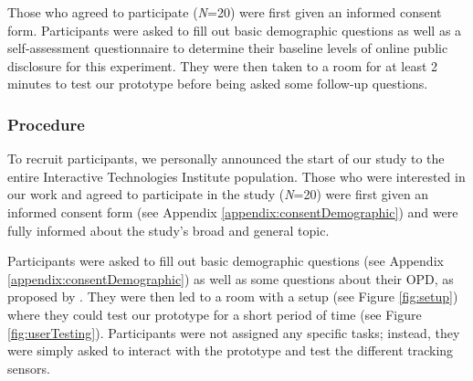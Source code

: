 Those who agreed to participate (\textit{N}=20) were first given an informed consent form. Participants were asked to fill out basic demographic questions as well as a self-assessment questionnaire to determine their baseline levels of online public disclosure for this experiment. They were then taken to a room for at least 2 minutes to test our prototype before being asked some follow-up questions.

\subsubsection{Procedure}
To recruit participants, we personally announced the start of our study to the entire Interactive Technologies Institute population. Those who were interested in our work and agreed to participate in the study (\textit{N}=20) were first given an informed consent form (see Appendix \ref{appendix:consentDemographic}) and were fully informed about the study's broad and general topic.

Participants were asked to fill out basic demographic questions (see Appendix \ref{appendix:consentDemographic}) as well as some questions about their OPD, as proposed by \cite{YUN06}. They were then led to a room with a setup (see Figure \ref{fig:setup}) where they could test our prototype for a short period of time (see Figure \ref{fig:userTesting}). Participants were not assigned any specific tasks; instead, they were simply asked to interact with the prototype and test the different tracking sensors.

